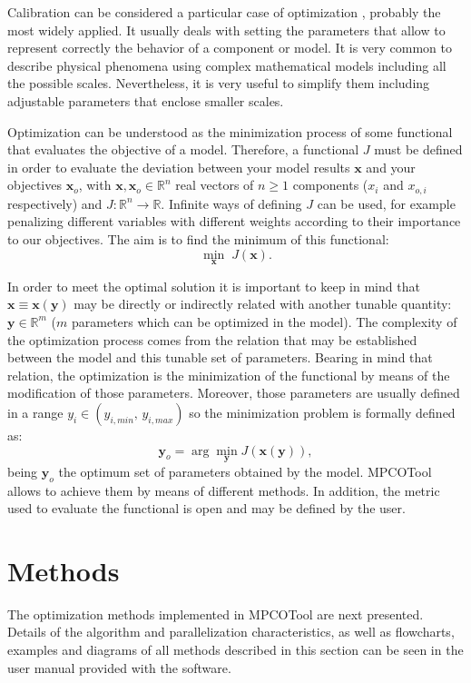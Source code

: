 \documentclass[review,authoryear]{elsarticle}
\newcommand{\EQ}[2]
{\begin{equation}#1\label{#2}\end{equation}}
\newcommand{\PA}[1]{\left(#1\right)}
\begin{document}
Calibration can be considered a particular case of optimization
\citep{WrightNocedal99}, probably the most widely applied. It usually deals with
setting the parameters that allow to represent correctly the behavior of a
component or model. It is very common to describe physical phenomena using
complex mathematical models including all the possible scales. Nevertheless, it
is very useful to simplify them including adjustable parameters that enclose
smaller scales.

Optimization can be understood as the minimization process of some functional
that evaluates the objective of a model. Therefore, a functional $J$ must be
defined in order to evaluate the deviation between your model results
$\mathbf{x}$ and your objectives $\mathbf{x}_o$, with
$\mathbf{x},\mathbf{x}_o\in\mathbb{R}^n$ real vectors of $n\ge 1$
components ($x_i$ and $x_{o,i}$ respectively) and
$J:\mathbb{R}^n \rightarrow \mathbb{R}$. 
Infinite ways of defining $J$ can be used, for example penalizing different
variables with different weights according to their importance to our
objectives. The aim is to find the minimum of this functional:
\EQ{\min_{\mathbf{x}}\;J\PA{\mathbf{x}}.}{EqFunctionalMin}

In order to meet the optimal solution it is important to keep in mind that
$\mathbf{x}\equiv\mathbf{x}\PA{\mathbf{y}}$ may be directly or indirectly
related with another tunable quantity: $\mathbf{y}\in\mathbb{R}^m$  ($m$
parameters which can be optimized in the model). The complexity of the
optimization process comes from the relation that may be established between the
model and this tunable set of parameters. Bearing in mind that relation, the
optimization is the minimization of the functional by means of the modification
of those parameters. Moreover, those parameters are usually defined in a range
$y_i\in\PA{y_{i,min},\,y_{i,max}}$ so the minimization problem is formally
defined as:
\EQ
{
	\mathbf{y}_o=\arg\min_{\mathbf{y}}J\PA{\mathbf{x}\PA{\mathbf{y}}},
}{EqParametersOptimal}
being $\mathbf{y}_o$ the optimum set of parameters obtained by the model.
MPCOTool allows to achieve them by means of different methods. In addition,
the metric used to evaluate the functional is open and may be defined by the
user.

\section{Methods}

The optimization methods implemented in MPCOTool are next presented.
Details of the algorithm and parallelization characteristics, as well as
flowcharts, examples and diagrams of all methods described in this section can
be seen in the user manual provided with the software.
\end{document}
